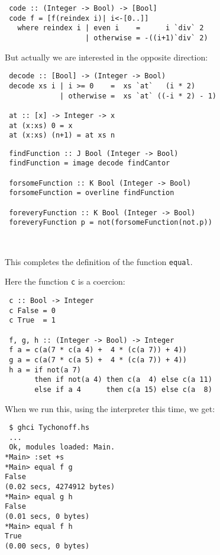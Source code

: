 \documentclass%
[%
Screen4to3,
]{foils}
\begin{document}
\vfill

\begin{verbatim}
 code :: (Integer -> Bool) -> [Bool]
 code f = [f(reindex i)| i<-[0..]]
   where reindex i | even i    =      i `div` 2
                   | otherwise = -((i+1)`div` 2)
\end{verbatim}

But actually we are interested in the opposite direction:
\begin{verbatim}
 decode :: [Bool] -> (Integer -> Bool)
 decode xs i | i >= 0    =  xs `at`   (i * 2)
             | otherwise =  xs `at` ((-i * 2) - 1)

 at :: [x] -> Integer -> x
 at (x:xs) 0 = x
 at (x:xs) (n+1) = at xs n
\end{verbatim}



\begin{verbatim}
 findFunction :: J Bool (Integer -> Bool)
 findFunction = image decode findCantor

 forsomeFunction :: K Bool (Integer -> Bool)
 forsomeFunction = overline findFunction

 foreveryFunction :: K Bool (Integer -> Bool)
 foreveryFunction p = not(forsomeFunction(not.p))
\end{verbatim}

~

This completes the definition of the function \verb+equal+.

Here the function \verb+c+ is a coercion:
\begin{verbatim}
 c :: Bool -> Integer
 c False = 0
 c True  = 1

 f, g, h :: (Integer -> Bool) -> Integer
 f a = c(a(7 * c(a 4) +  4 * (c(a 7)) + 4))
 g a = c(a(7 * c(a 5) +  4 * (c(a 7)) + 4))
 h a = if not(a 7)
       then if not(a 4) then c(a  4) else c(a 11)
       else if a 4      then c(a 15) else c(a  8)
\end{verbatim}

When we run this, using the
interpreter this time, we get:
\begin{verbatim}
 $ ghci Tychonoff.hs
 ...
 Ok, modules loaded: Main.
*Main> :set +s
*Main> equal f g
False
(0.02 secs, 4274912 bytes)
*Main> equal g h
False
(0.01 secs, 0 bytes)
*Main> equal f h
True
(0.00 secs, 0 bytes)
\end{verbatim}
\end{document}
